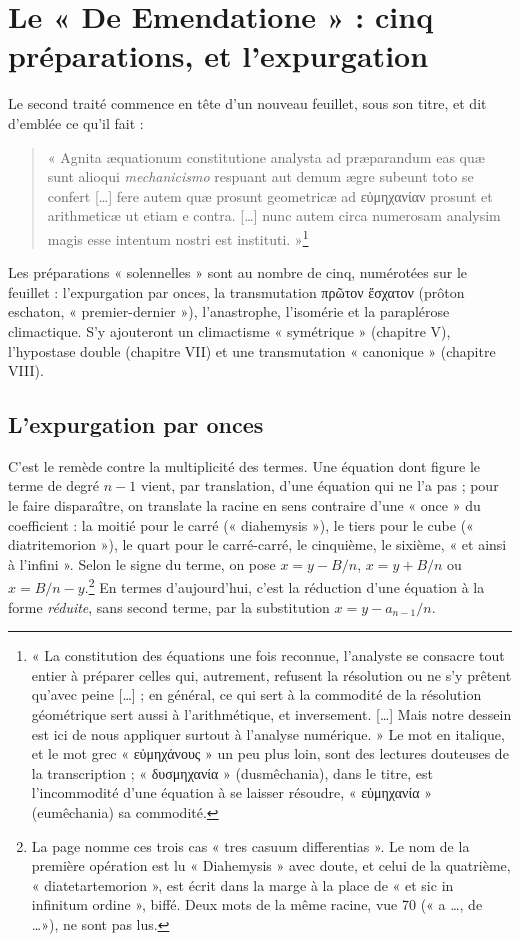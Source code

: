 \documentclass[11pt,a4paper]{article}
\begin{document}
\section*{Le « De Emendatione » : cinq préparations, et l'expurgation}

Le second traité commence en tête d'un nouveau feuillet, sous son titre, et dit
d'emblée ce qu'il fait :

\begin{quote}
« Agnita æquationum constitutione analysta ad præparandum eas quæ sunt alioqui
\emph{mechanicismo} respuant aut demum ægre subeunt toto se confert [\ldots]
fere autem quæ prosunt geometricæ ad εὐμηχανίαν prosunt et arithmeticæ ut
etiam e contra. [\ldots] nunc autem circa numerosam analysim magis esse intentum
nostri est instituti. »\footnote{« La constitution des équations une fois
reconnue, l'analyste se consacre tout entier à préparer celles qui, autrement,
refusent la résolution ou ne s'y prêtent qu'avec peine [\ldots] ; en général, ce
qui sert à la commodité de la résolution géométrique sert aussi à
l'arithmétique, et inversement. [\ldots] Mais notre dessein est ici de nous
appliquer surtout à l'analyse numérique. » Le mot en italique, et le mot grec
« εὐμηχάνους » un peu plus loin, sont des lectures douteuses de la
transcription ; « δυσμηχανία » (dusmêchania), dans le titre, est l'incommodité d'une
équation à se laisser résoudre, « εὐμηχανία » (eumêchania) sa commodité.}
\end{quote}

Les préparations « solennelles » sont au nombre de cinq, numérotées sur le
feuillet : l'expurgation par onces, la transmutation πρῶτον ἔσχατον
(prôton eschaton, « premier-dernier »),
l'anastrophe, l'isomérie et la paraplérose climactique. S'y ajouteront un
climactisme « symétrique » (chapitre V), l'hypostase double (chapitre VII) et
une transmutation « canonique » (chapitre VIII).

\subsection*{L'expurgation par onces}

C'est le remède contre la multiplicité des termes. Une équation dont figure le
terme de degré $n - 1$ vient, par translation, d'une équation qui ne l'a pas ;
pour le faire disparaître, on translate la racine en sens contraire d'une
« once » du coefficient : la moitié pour le carré (« diahemysis »), le tiers pour
le cube (« diatritemorion »), le quart pour le carré-carré, le cinquième, le
sixième, « et ainsi à l'infini ». Selon le signe du terme, on pose
$x = y - B/n$, $x = y + B/n$ ou $x = B/n - y$.\footnote{La page nomme ces trois cas
« tres casuum differentias ». Le nom de la première opération est lu
« Diahemysis » avec doute, et celui de la quatrième, « diatetartemorion », est
écrit dans la marge à la place de « et sic in infinitum ordine », biffé. Deux
mots de la même racine, vue 70 (« a \ldots, de \ldots »), ne sont pas lus.} En
termes d'aujourd'hui, c'est la réduction d'une équation à la forme
\emph{réduite}, sans second terme, par la substitution $x = y - a_{n-1}/n$.
\end{document}
